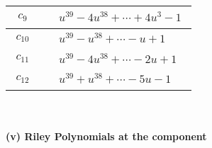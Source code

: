 \documentclass[1p]{elsarticle_modified}
\theoremstyle{definition}
\begin{document}
\begin{tabular}{m{50pt}|m{274pt}}
\hline $$\begin{aligned}c_{9}\end{aligned}$$&$\begin{aligned}
&u^{39}-4 u^{38}+\cdots+4 u^3-1
\end{aligned}$\\
\hline $$\begin{aligned}c_{10}\end{aligned}$$&$\begin{aligned}
&u^{39}- u^{38}+\cdots- u+1
\end{aligned}$\\
\hline $$\begin{aligned}c_{11}\end{aligned}$$&$\begin{aligned}
&u^{39}-4 u^{38}+\cdots-2 u+1
\end{aligned}$\\
\hline $$\begin{aligned}c_{12}\end{aligned}$$&$\begin{aligned}
&u^{39}+u^{38}+\cdots-5 u-1
\end{aligned}$\\
\hline
\end{tabular}\\~\\
\newpage\renewcommand{\arraystretch}{1}
\flushleft \textbf{(v) Riley Polynomials at the component}\newline \\
\end{document}
